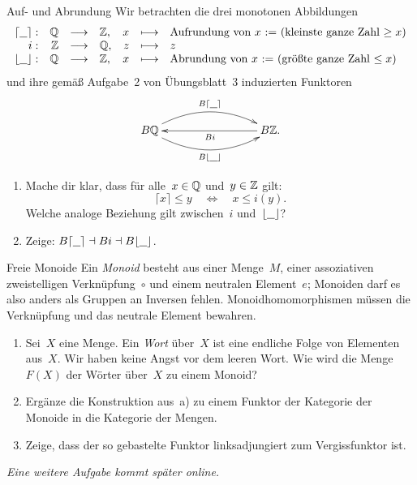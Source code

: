 \documentclass{pizzablatt}
\begin{document}

\begin{aufgabe}{Auf- und Abrundung}
Wir betrachten die drei monotonen Abbildungen
\[ \begin{array}{@{}rrclrcl@{}}
  \lceil\freist\rceil: & \QQ &\longrightarrow& \ZZ, &
  x &\longmapsto& \text{Aufrundung von~$x$ := (kleinste ganze Zahl~$\geq x$)} \\
  i: & \ZZ &\longrightarrow& \QQ, &
  z &\longmapsto& z \\
  \lfloor\freist\rfloor: & \QQ &\longrightarrow& \ZZ, &
  x &\longmapsto& \text{Abrundung von~$x$ := (größte ganze Zahl~$\leq x$)}
\end{array} \]
und ihre gemäß Aufgabe~2 von Übungsblatt~3 induzierten Funktoren
\[ \xymatrixcolsep{7pc}\xymatrix{
  B\QQ
    \ar@/^1.4pc/[r]^{B\lceil\freist\rceil}
    \ar@/_1.4pc/[r]_{B\lfloor\freist\rfloor}
  & B\ZZ. \ar[l]^{Bi}
} \]
\begin{enumerate}
\item Mache dir klar, dass für alle~$x \in \mathbb{Q}$ und~$y \in \mathbb{Z}$ gilt:
\[ \lceil x \rceil \leq y \quad\Longleftrightarrow\quad
  x \leq i(y). \]
Welche analoge Beziehung gilt zwischen~$i$ und~$\lfloor\underline{\ \ }\rfloor$?
\item Zeige: $B\lceil\underline{\ \ }\rceil \dashv Bi \dashv B\lfloor\underline{\ \ }\rfloor$.
\end{enumerate}
\end{aufgabe}

\begin{aufgabe}{Freie Monoide}
Ein \emph{Monoid} besteht aus einer Menge~$M$, einer assoziativen
zweistelligen Verknüpfung~$\circ$ und einem neutralen Element~$e$; Monoiden
darf es also anders als Gruppen an Inversen fehlen. Monoidhomomorphismen müssen
die Verknüpfung und das neutrale Element bewahren.
\begin{enumerate}
\item
Sei~$X$ eine Menge. Ein \emph{Wort} über~$X$ ist eine endliche Folge von
Elementen aus~$X$. Wir haben keine Angst vor dem leeren Wort. Wie wird die
Menge~$F(X)$ der Wörter über~$X$ zu einem Monoid?
\item Ergänze die Konstruktion aus~a) zu einem Funktor der Kategorie der
Monoide in die Kategorie der Mengen.
\item Zeige, dass der so gebastelte Funktor linksadjungiert zum Vergissfunktor
ist.
\end{enumerate}
\end{aufgabe}

\emph{Eine weitere Aufgabe kommt später online.}
\end{document}
